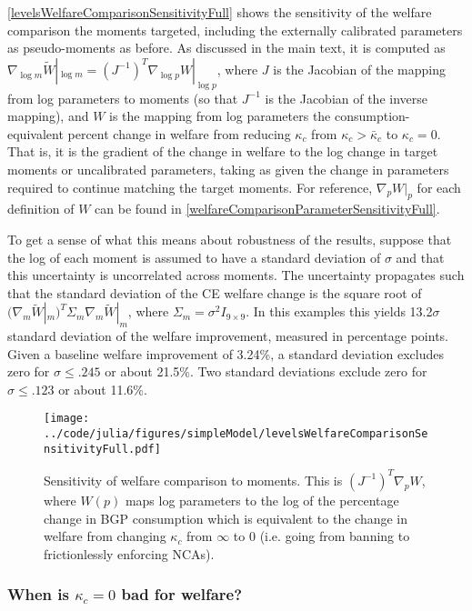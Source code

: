\documentclass[11pt,english]{article}
\theoremstyle{definition}
\begin{document}
\autoref{levelsWelfareComparisonSensitivityFull} shows the sensitivity of the welfare comparison the moments targeted, including the externally calibrated parameters as pseudo-moments as before. As discussed in the main text, it is computed as $\nabla_{\log m} \tilde{W}|_{\log m} = (J^{-1})^T \nabla_{\log p} W|_{\log p}$, where $J$ is the Jacobian of the mapping from log parameters to moments (so that $J^{-1}$ is the Jacobian of the inverse mapping), and $W$ is the mapping from log parameters the consumption-equivalent percent change in welfare from reducing $\kappa_c$ from $\kappa_c > \bar{\kappa}_c$ to $\kappa_c = 0$. That is, it is the gradient of the change in welfare to the log change in target moments or uncalibrated parameters, taking as given the change in parameters required to continue matching the target moments. For reference, $\nabla_p W|_p$  for each definition of $W$ can be found in \autoref{welfareComparisonParameterSensitivityFull}.

To get a sense of what this means about robustness of the results, suppose that the log of each moment is assumed to have a standard deviation of $\sigma$ and that this uncertainty is uncorrelated across moments. The uncertainty propagates such that the standard deviation of the CE welfare change is the square root of $(\nabla_m \tilde{W}|_m)^T \Sigma_m \nabla_m \tilde{W}|_m$, where $\Sigma_m = \sigma^2 I_{9\times 9}$. In this examples this yields 13.2$\sigma$ standard deviation of the welfare improvement, measured in percentage points. Given a baseline welfare improvement of 3.24\%, a standard deviation excludes zero for $\sigma \le .245$ or about 21.5\%. Two standard deviations exclude zero for $\sigma \le .123$ or about 11.6\%. 

\begin{figure}[]
	\centering
	\texttt{[image: ../code/julia/figures/simpleModel/levelsWelfareComparisonSensitivityFull.pdf]}
	\caption{Sensitivity of welfare comparison to moments. This is $(J^{-1})^T \nabla_p W$, where $W(p)$ maps log parameters to the log of the percentage change in BGP consumption which is equivalent to the change in welfare from changing $\kappa_c$ from $\infty$ to $0$ (i.e. going from banning to frictionlessly enforcing NCAs).}
	\label{levelsWelfareComparisonSensitivityFull}
\end{figure}


\subsubsection{When is $\kappa_c = 0$ bad for welfare?}
\end{document}
